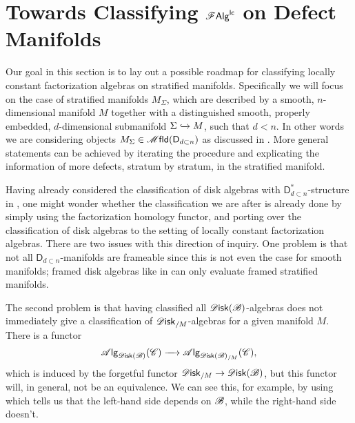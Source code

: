 \documentclass[../text]{subfiles}
\begin{document}
\section{Towards Classifying \texorpdfstring{$\mathscr{F} \mathsf{Alg}^{\mathsf{lc}}$}{FAlglc} on Defect Manifolds}\label{ch:classif_defect_mfld}

Our goal in this section is to lay out a possible roadmap for classifying locally constant factorization algebras on stratified manifolds. Specifically we will focus on the case of stratified manifolds $M_{\Sigma}$, which are described by a smooth, $n$-dimensional manifold $M$ together with a distinguished smooth, properly embedded, $d$-dimensional submanifold $\Sigma \xhookrightarrow{} M$, such that $d < n$. In other words we are considering objects $M_{\Sigma} \in \mfld(\mathsf{D}_{d \subset n})$ as discussed in . More general statements can be achieved by iterating the procedure and explicating the information of more defects, stratum by stratum, in the stratified manifold.

\begin{remark}\label{rem:disk_not_enough}
    Having already considered the classification of disk algebras with $\mathsf{D}_{d \subset n}^*$-structure in , one might wonder whether the classification we are after is already done by simply using the factorization homology functor, and porting over the classification of disk algebras to the setting of locally constant factorization algebras. There are two issues with this direction of inquiry. One problem is that not all $\mathsf{D}_{d \subset n}$-manifolds are frameable since this is not even the case for smooth manifolds; framed disk algebras like in  can only evaluate framed stratified manifolds.
    
    The second problem is that having classified all $\disk(\bstr)$-algebras does not immediately give a classification of $\disk_{/M}$-algebras for a given manifold $M$. There is a functor
    \begin{equation}
        \alg{\disk(\bstr)}(\catC) \xrightarrow{\quad} \alg{\disk(\bstr)_{/M}} (\catC),
    \end{equation}
    which is induced by the forgetful functor $\disk_{/M} \rightarrow \disk(\bstr)$, but this functor will, in general, not be an equivalence. We can see this, for example, by using  which tells us that the left-hand side depends on $\mathscr{B}$, while the right-hand side doesn't. 
\end{remark}
\end{document}
